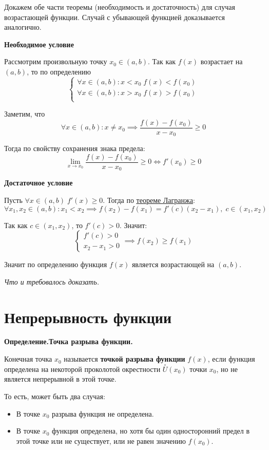 \documentclass[a4paper,12pt,oneside]{extbook}
\newcommand{\newpar}{$ $\par\nobreak\ignorespaces}
\newenvironment{definition}[1][]{\noindent\textbf{Определение.\if\relax\detokenize{#1}\relax\else\;#1.\fi}\newpar}{\bigskip}
\theoremstyle{numbered}
\theoremstyle{unnumbered}
\theoremstyle{named}
\theoremstyle{unnumbered}
\theoremstyle{named}
\theoremstyle{named}
\theoremstyle{named}
\renewenvironment{proof}[1][]{\breakenv[Доказательство]{\if\relax\detokenize{#1}\relax\else\;\fi}{\textbf{#1}}}{\smallskip\newpar \hfill\textit{Что и требовалось доказать.}}
\newcommand{\plink}[2]{\hyperref[#1]{\color{blue}\underline{#2}}}
\begin{document}
\begin{proof}
    Докажем обе части теоремы (необходимость и достаточность) для случая возрастающей функции. Случай с убывающей функцией доказывается аналогично.

    \medskip
    \textbf{Необходимое условие}

    Рассмотрим произвольную точку \(x_0 \in (a, b)\). Так как \(f(x)\) возрастает на \((a, b)\), то по определению
    \[
        \begin{cases}
            \forall x \in (a, b): x < x_0 \; f(x) < f(x_0) \\
            \forall x \in (a, b): x > x_0 \; f(x) > f(x_0) \\
        \end{cases}
    \]

    Заметим, что
    \[
        \forall x \in (a, b): x \neq x_0 \implies \frac{f(x) - f(x_0)}{x - x_0} \geq 0
    \]

    Тогда по свойству сохранения знака предела:
    \[
        \lim_{x \to x_0}{\dfrac{f(x) - f(x_0)}{x - x_0}} \geq 0 \iff f'(x_0) \geq 0
    \]

    \textbf{Достаточное условие}

    Пусть \(\forall x \in (a, b) \; f'(x) \geq 0\). Тогда по \plink{theorem:Теорема Лагранжа}{теореме Лагранжа}:
    \[
        \forall x_1, x_2 \in (a, b): x_1 < x_2 \implies f(x_2) - f(x_1) = f'(c)(x_2 - x_1), \; c \in (x_1, x_2)
    \]

    Так как \(c \in (x_1, x_2)\), то \(f'(c) > 0\). Значит:
    \[
        \begin{cases}
            f'(c) > 0 \\
            x_2 - x_1 > 0
        \end{cases}
        \implies
        f(x_2) \geq f(x_1)
    \]

    Значит по определению функция \(f(x)\) является возрастающей на \((a, b)\).
\end{proof}

\section{Непрерывность функции}%
\label{sec:Непрерывность функции}

\begin{definition}[Точка разрыва функции]
    Конечная точка \(x_0\) называется \textbf{точкой разрыва функции} \(f(x)\), если функция определена на некоторой проколотой окрестности \(\overset{\circ}{U}(x_0)\) точки \(x_0\), но не является непрерывной в этой точке.

    То есть, может быть два случая:
    \begin{itemize}
        \item {В точке \(x_0\) разрыва функция не определена.}
        \item {В точке \(x_0\) функция определена, но хотя бы один односторонний предел в этой точке или не существует, или не равен значению \(f(x_0)\).}
    \end{itemize}
\end{definition}
\end{document}
